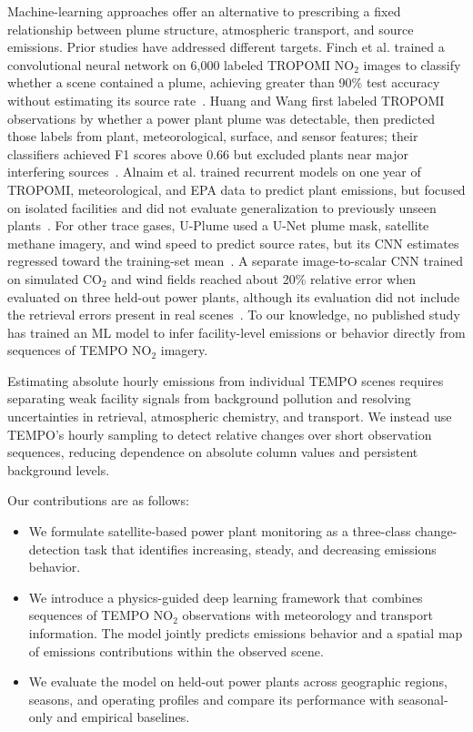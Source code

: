 \documentclass[sigconf,nonacm]{acmart}
\begin{document}
Machine-learning approaches offer an alternative to prescribing a fixed relationship
between plume structure, atmospheric transport, and source emissions. Prior studies
have addressed different targets. Finch et al. trained a convolutional neural network
on 6,000 labeled TROPOMI NO$_2$ images to classify whether a scene contained a plume,
achieving greater than 90\% test accuracy without estimating its source rate~\cite{finch2022automated}.
Huang and Wang first labeled TROPOMI observations by whether a power plant plume was
detectable, then predicted those labels from plant, meteorological, surface, and sensor
features; their classifiers achieved F1 scores above 0.66 but excluded plants near
major interfering sources~\cite{huang2026detectability}. Alnaim et al. trained recurrent
models on one year of TROPOMI, meteorological, and EPA data to predict plant emissions,
but focused on isolated facilities and did not evaluate generalization to previously
unseen plants~\cite{alnaim2022evaluating}. For other trace gases, U-Plume used a U-Net
plume mask, satellite methane imagery, and wind speed to predict source rates, but its
CNN estimates regressed toward the training-set mean~\cite{bruno2024uplume}. A separate
image-to-scalar CNN trained on simulated CO$_2$ and wind fields reached about 20\%
relative error when evaluated on three held-out power plants, although its evaluation
did not include the retrieval errors present in real scenes~\cite{dumont2024deepLearning}.
To our knowledge, no published study has trained an ML model to infer facility-level
emissions or behavior directly from sequences of TEMPO NO$_2$ imagery.

Estimating absolute hourly emissions from individual TEMPO scenes requires
separating weak facility signals from background pollution and resolving
uncertainties in retrieval, atmospheric chemistry, and transport. We instead
use TEMPO's hourly sampling to detect relative changes over short observation
sequences, reducing dependence on absolute column values and persistent
background levels.

Our contributions are as follows:

\begin{itemize}
    \item We formulate satellite-based power plant monitoring as a three-class
    change-detection task that identifies increasing, steady, and decreasing
    emissions behavior.

    \item We introduce a physics-guided deep learning framework that combines
    sequences of TEMPO NO$_2$ observations with meteorology and transport
    information. The model jointly predicts emissions behavior and a spatial
    map of emissions contributions within the observed scene.

    \item We evaluate the model on held-out power plants across geographic
    regions, seasons, and operating profiles and compare its performance with
    seasonal-only and empirical baselines.
\end{itemize}
\end{document}
